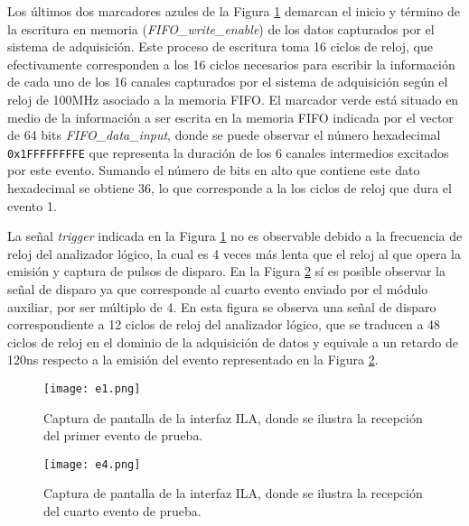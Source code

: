 	Los últimos dos marcadores azules de la Figura \ref{img:e1} demarcan el inicio y término de la escritura en memoria (\textit{FIFO\_write\_enable}) de los datos capturados por el sistema de adquisición. Este proceso de escritura toma 16 ciclos de reloj, que efectivamente corresponden a los 16 ciclos necesarios para escribir la información de cada uno de los 16 canales capturados por el sistema de adquisición según el reloj de 100MHz asociado a la memoria FIFO. El marcador verde está situado en medio de la información a ser escrita en la memoria FIFO indicada por el vector de 64 bits \textit{FIFO\_data\_input}, donde se puede observar el número hexadecimal \texttt{0x1FFFFFFFFE} que representa la duración de los 6 canales intermedios excitados por este evento. Sumando el número de bits en alto que contiene este dato hexadecimal se obtiene 36, lo que corresponde a la los ciclos de reloj que dura el evento 1.
	
	La señal \textit{trigger} indicada en la Figura \ref{img:e1} no es observable debido a la frecuencia de reloj del analizador lógico, la cual es 4 veces más lenta que el reloj al que opera la emisión y captura de pulsos de disparo. En la Figura \ref{img:e4} sí es posible observar la señal de disparo ya que corresponde al cuarto evento enviado por el módulo auxiliar, por ser múltiplo de 4. En esta figura  se observa una señal de disparo correspondiente a 12 ciclos de reloj del analizador lógico, que se traducen a 48 ciclos de reloj en el dominio de la adquisición de datos y equivale a un retardo de 120ns respecto a la emisión del evento representado en la Figura \ref{img:e4}.
	
	\begin{figure}[ht]
		\centering
		\texttt{[image: e1.png]}
		\caption{Captura de pantalla de la interfaz ILA, donde se ilustra la recepción del primer evento de prueba.}
		\label{img:e1}
	\end{figure}
	
	
	\begin{figure}[ht]
		\centering
		\texttt{[image: e4.png]}
		\caption{Captura de pantalla de la interfaz ILA, donde se ilustra la recepción del cuarto evento de prueba.}
		\label{img:e4}
	\end{figure}

